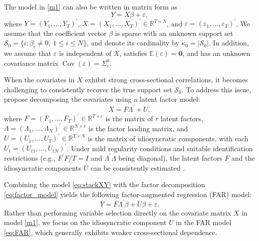 ﻿\documentclass[12pt]{article}
\newcommand{\0}{\mbox{\bf 0}}
\theoremstyle{plain}%
\theoremstyle{definition}
\DeclareMathOperator{\Cov}{Cov}
\begin{document}
The model in \eqref{m1} can also be written in matrix form as
\begin{equation}
Y = X\beta + \varepsilon, \label{eq:stackXY}
\end{equation}
where $Y = (Y_1, \ldots, Y_T)^{\prime}$, $X = (X_1, \ldots, X_T)^{\prime} \in \mathbb{R}^{T \times N}$, and $\varepsilon = (\varepsilon_1, \ldots, \varepsilon_T)^{\prime}$. We assume that the coefficient vector $\beta$ is sparse with an unknown support set $\mathcal{S}_0 = \{ i : \beta_i \neq 0, \ 1 \leq i \leq N \}$, and denote its cardinality by $\kappa_0 = |\mathcal{S}_0|$. In addition, we assume that $\varepsilon$ is independent of $X$, satisfies $\mathbb{E}(\varepsilon) = \mathbf{0}$, and has an unknown covariance matrix $\Cov(\varepsilon) = \Sigma_{\varepsilon}^0$.


When the covariates in $X$ exhibit strong cross-sectional correlations, it becomes challenging to consistently recover the true support set $\mathcal{S}_0$. To address this issue, \citet{FanKeWang2020} propose decomposing the covariates using a latent factor model:
\begin{equation}
X = F \Lambda^{\prime} + U, \label{eq:factor_model}
\end{equation}
where $F = (F_1, \ldots, F_T)^{\prime} \in \mathbb{R}^{T \times r}$ is the matrix of $r$ latent factors, $\Lambda = (\Lambda_1, \ldots, \Lambda_N)^{\prime} \in \mathbb{R}^{N \times r}$ is the factor loading matrix, and $U = (U_1, \ldots, U_T)^{\prime} \in \mathbb{R}^{T \times N}$ is the matrix of idiosyncratic components, with each $U_t = (U_{t1}, \ldots, U_{tN})^{\prime}$. Under mild regularity conditions and suitable identification restrictions (e.g., $F^{\prime} F / T = I$ and $\Lambda^{\prime} \Lambda$ being diagonal), the latent factors $F$ and the idiosyncratic components $U$ can be consistently estimated \citep{Bai2003}.



Combining the model \eqref{eq:stackXY} with the factor decomposition \eqref{eq:factor_model} yields the following factor-augmented regression (FAR) model:
\begin{equation}
Y = F \Lambda^{\prime} \beta + U \beta + \varepsilon. \label{eq:FAR}
\end{equation}
Rather than performing variable selection directly on the covariate matrix $X$ in model \eqref{m1}, we focus on the idiosyncratic component $U$ in the FAR model \eqref{eq:FAR}, which generally exhibits weaker cross-sectional dependence.
\end{document}

